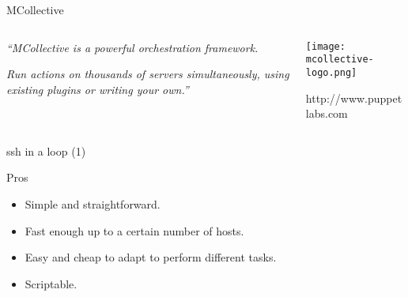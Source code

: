 \documentclass[presentation]{beamer}
\begin{document}
{
\begin{frame}[label=sec-10-1]{MCollective}

\begin{columns}
\begin{column}{0.6\textwidth}

\textit{``MCollective is a powerful orchestration framework.}

\textit{Run actions on thousands of servers simultaneously, using existing plugins or writing your own.''}
\end{column}

\begin{column}{0.4\textwidth}

\texttt{[image: mcollective-logo.png]}

\small{http://www.puppetlabs.com}
\end{column}
\end{columns}
\end{frame}
} %


{
\begin{frame}[label=sec-10-2]{ssh in a loop (1)}

\begin{block}{Pros}

\begin{itemize}
\item Simple and straightforward.
\item Fast enough up to a certain number of hosts.
\item Easy and cheap to adapt to perform different tasks.
\item Scriptable.
\end{itemize}
\end{block}
\end{frame}
} %
\end{document}
